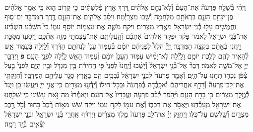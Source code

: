 \documentclass[twoside, openany, parskip=half, 11pt]{book}
\begin{document}
\begin{footnotesize}
\begin{multicols}{2}
\\
וַיְהִ֗י בְּ֯שַׁלַּ֣ח פַּרְעֹה֘ אֶת־הָעָם֒ וְ֯לֹֽא־נָחָ֣ם אֱלֹהִ֗ים דֶּ֚רֶךְ אֶ֣רֶץ פְּ֯לִשְׁתִּ֔ים כִּ֥י קָר֖וֹב ה֑וּא כִּ֣י אָמַ֣ר אֱלֹהִ֗ים פֶּן־יִנָּחֵ֥ם הָעָ֛ם בִּרְאֹתָ֥ם מִלְחָמָ֖ה וְ֯שָׁ֥בוּ מִצְרָֽיְ֯מָה׃ וַיַּסֵּ֨ב אֱלֹהִ֧ים אֶת־הָעָ֛ם דֶּ֥רֶךְ הַמִּדְבָּ֖ר יַם־ס֑וּף וַֽחֲמֻשִׁ֛ים עָל֥וּ בְ֯נֵֽי־יִשְׂרָאֵ֖ל מֵאֶ֥רֶץ מִצְרָֽיִם׃ וַיִּקַּ֥ח מֹשֶׁ֛ה אֶת־עַצְמ֥וֹת יוֹסֵ֖ף עִמּ֑וֹ כִּי֩ הַשְׁבֵּ֨עַ הִשְׁבִּ֜יעַ אֶת־בְּ֯נֵ֤י יִשְׂרָאֵל֙ לֵאמֹ֔ר פָּקֹ֨ד יִפְקֹ֤ד אֱלֹהִים֙ אֶתְכֶ֔ם וְ֯הַֽעֲלִיתֶ֧ם אֶת־עַצְמֹתַ֛י מִזֶּ֖ה אִתְּ֯כֶֽם׃
וַיִּסְע֖וּ מִסֻּכֹּ֑ת וַיַּֽחֲנ֣וּ בְ֯אֵתָ֔ם בִּקְצֵ֖ה הַמִּדְבָּֽר׃ וַֽיְיָ֡ הֹלֵךְ֩ לִפְנֵיהֶ֨ם יוֹמָ֜ם בְּ֯עַמּ֤וּד עָנָן֙ לַנְחֹתָ֣ם הַדֶּ֔רֶךְ וְ֯לַ֛יְלָה בְּ֯עַמּ֥וּד אֵ֖שׁ לְ֯הָאִ֣יר לָהֶ֑ם לָלֶ֖כֶת יוֹמָ֥ם וָלָֽיְ֯לָה׃ לֹֽא־יָמִ֞ישׁ עַמּ֤וּד הֶֽעָנָן֙ יוֹמָ֔ם וְ֯עַמּ֥וּד הָאֵ֖שׁ לָ֑יְ֯לָה לִפְנֵ֖י הָעָֽם׃ \textbf{פ}
וַיְדַבֵּ֥ר יְיָ֖ אֶל־מֹשֶׁ֥ה לֵּאמֹֽר׃ דַּבֵּר֘ אֶל־בְּ֯נֵ֣י יִשְׂרָאֵל֒ וְ֯יָשֻׁ֗בוּ וְ֯יַֽחֲנוּ֙ לִפְנֵי֙ פִּ֣י הַֽחִירֹ֔ת בֵּ֥ין מִגְדֹּ֖ל וּבֵ֣ין הַיָּ֑ם לִפְנֵי֙ בַּ֣עַל צְ֯פֹ֔ן נִכְח֥וֹ תַֽחֲנ֖וּ עַל־הַיָּֽם׃ וְ֯אָמַ֤ר פַּרְעֹה֙ לִבְנֵ֣י יִשְׂרָאֵ֔ל נְ֯בֻכִ֥ים הֵ֖ם בָּאָ֑רֶץ סָגַ֥ר עֲלֵיהֶ֖ם הַמִּדְבָּֽר׃ וְ֯חִזַּקְתִּ֣י אֶת־לֵב־פַּרְעֹה֘ וְ֯רָדַ֣ף אַֽחֲרֵיהֶם֒ וְ֯אִכָּֽבְ֯דָ֤ה בְּ֯פַרְעֹה֙ וּבְכׇל־חֵיל֔וֹ וְ֯יָֽדְ֯ע֥וּ מִצְרַ֖יִם כִּֽי־אֲנִ֣י יְיָ֑ וַיַּֽעֲשׂוּ־כֵֽן׃
וַיֻּגַּד֙ לְ֯מֶ֣לֶךְ מִצְרַ֔יִם כִּ֥י בָרַ֖ח הָעָ֑ם וַיֵּֽ֠הָפֵ֠ךְ לְ֯בַ֨ב פַּרְעֹ֤ה וַֽעֲבָדָיו֙ אֶל־הָעָ֔ם וַיֹּֽאמְ֯רוּ֙ מַה־זֹּ֣את עָשִׂ֔ינוּ כִּֽי־שִׁלַּ֥חְנוּ אֶת־יִשְׂרָאֵ֖ל מֵֽעָבְ֯דֵֽנוּ׃ וַיֶּאְסֹ֖ר אֶת־רִכְבּ֑וֹ וְ֯אֶת־עַמּ֖וֹ לָקַ֥ח עִמּֽוֹ׃ וַיִּקַּ֗ח שֵׁשׁ־מֵא֥וֹת רֶ֨כֶב֙ בָּח֔וּר וְ֯כֹ֖ל רֶ֣כֶב מִצְרָ֑יִם וְ֯שָֽׁלִשִׁ֖ם עַל־כֻּלּֽוֹ׃ וַיְחַזֵּ֣ק יְיָ֗ אֶת־לֵ֤ב פַּרְעֹה֙ מֶ֣לֶךְ מִצְרַ֔יִם וַיִּרְדֹּ֕ף אַֽחֲרֵ֖י בְּ֯נֵ֣י יִשְׂרָאֵ֑ל וּבְנֵ֣י יִשְׂרָאֵ֔ל יֹֽצְ֯אִ֖ים בְּ֯יָ֥ד רָמָֽה׃


\end{multicols}
\end{footnotesize}
\end{document}
